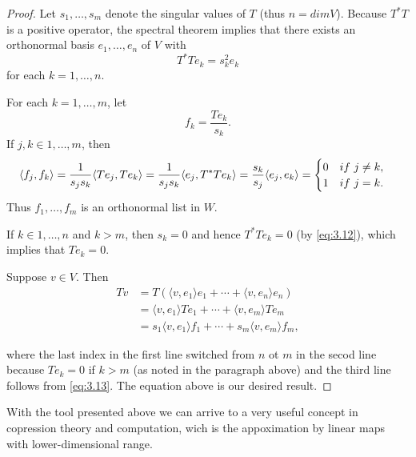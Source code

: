 \documentclass{scrartcl}
\begin{document}
\begin{proof}
  Let $s_1, \ldots ,s_m$ denote the singular values of $T$ (thus $n = dimV$). Because $T^* T$ is a positive operator, the spectral theorem implies that there exists an orthonormal basis $e_1, \ldots ,e_n$ of $V$ with
  \[
    T^* Te_k = s^2_k e_k \tag{3.12} \label{eq:3.12}
  \]
for each $k = 1, \ldots ,n$.

\quad For each $k = 1,\ldots ,m$, let
\[
  f_k = \frac{Te_k}{s_k}. \tag{3.13} \label{eq:3.13}
\]
If $j,k \in {1,\ldots ,m}$, then
\[
  \langle f_j,f_k \rangle = \frac{1}{s_j s_k} \langle Te_j, Te_k \rangle = \frac{1}{s_j s_k}\langle e_j, T^* T e_k \rangle = \frac{s_k}{s_j}\langle e_j, e_k \rangle = \begin{cases} 0 \hspace{10px} if\ j \neq k,\\ 1 \hspace{10px} if\ j = k. \end{cases}
\]
Thus $f_1,\ldots ,f_m$ is an orthonormal list in $W$.

\quad If $k \in {1,\ldots ,n}$ and $k > m$, then $s_k = 0$ and hence $T^* Te_k = 0$ (by \ref{eq:3.12}), which implies that $Te_k = 0$.

\quad Suppose $v\in V$. Then
\begin{align*}
  Tv &= T \left( \langle v,e_1 \rangle e_1 + \cdots + \langle v,e_n \rangle e_n \right) \\
     &= \langle v,e_1 \rangle Te_1 + \cdots + \langle v,e_m \rangle Te_m \\
     &= s_1 \langle v,e_1 \rangle f_1 + \cdots + s_m \langle v,e_m \rangle f_m,
\end{align*}

where the last index in the first line switched from $n$ ot $m$ in the secod line because $Te_k = 0$ if $k > m$ (as noted in the paragraph above) and the third line follows from \ref{eq:3.13}. The equation above is our desired result.
\end{proof}

With the tool presented above we can arrive to a very useful concept in copression theory and computation, wich is the appoximation by linear maps with lower-dimensional range.
\end{document}
